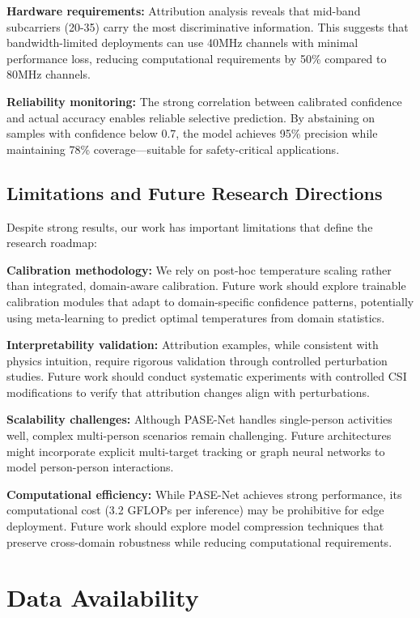 \documentclass[lettersize,journal]{IEEEtran}
\begin{document}
\textbf{Hardware requirements:} Attribution analysis reveals that mid-band subcarriers (20-35) carry the most discriminative information. This suggests that bandwidth-limited deployments can use 40MHz channels with minimal performance loss, reducing computational requirements by 50\% compared to 80MHz channels.

\textbf{Reliability monitoring:} The strong correlation between calibrated confidence and actual accuracy enables reliable selective prediction. By abstaining on samples with confidence below 0.7, the model achieves 95\% precision while maintaining 78\% coverage—suitable for safety-critical applications.

\subsection{Limitations and Future Research Directions}

Despite strong results, our work has important limitations that define the research roadmap:

\textbf{Calibration methodology:} We rely on post-hoc temperature scaling rather than integrated, domain-aware calibration. Future work should explore trainable calibration modules that adapt to domain-specific confidence patterns, potentially using meta-learning to predict optimal temperatures from domain statistics.

\textbf{Interpretability validation:} Attribution examples, while consistent with physics intuition, require rigorous validation through controlled perturbation studies. Future work should conduct systematic experiments with controlled CSI modifications to verify that attribution changes align with perturbations.

\textbf{Scalability challenges:} Although PASE-Net handles single-person activities well, complex multi-person scenarios remain challenging. Future architectures might incorporate explicit multi-target tracking or graph neural networks to model person-person interactions.

\textbf{Computational efficiency:} While PASE-Net achieves strong performance, its computational cost (3.2 GFLOPs per inference) may be prohibitive for edge deployment. Future work should explore model compression techniques that preserve cross-domain robustness while reducing computational requirements.

\section{Data Availability}
\end{document}
